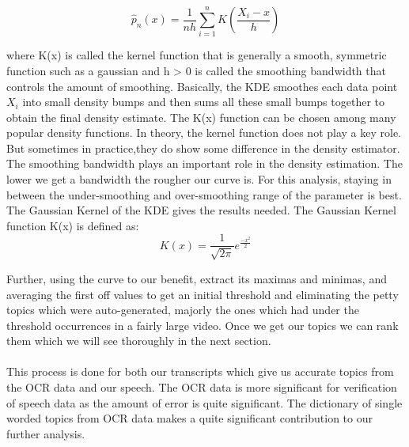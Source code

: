 \documentclass[conference]{IEEEtran}
\begin{document}
$$ \hat{p}_{n}(x) = \frac{1}{nh}\sum\limits_{i=1}^n K(\frac{X_{i}-x}{h})$$

\indent where K(x) is called the kernel function that is generally a smooth, symmetric function such as a gaussian and h > 0 is called the smoothing bandwidth that controls the amount of smoothing. Basically, the KDE smoothes each data point $X_{i}$ into small density bumps and then sums all these small bumps together to obtain the final density estimate. \cite{b6} The K(x) function can be chosen among many popular density functions. In theory, the kernel function does not play a key role. But sometimes in practice,they do show some difference in the density estimator. \cite{b6} The smoothing bandwidth plays an important role in the density estimation. The lower we get a bandwidth the rougher our curve is. For this analysis, staying in between the under-smoothing and over-smoothing range of the parameter is best.\\
\indent	The Gaussian Kernel of the KDE gives the results needed. The Gaussian Kernel function K(x) is defined as:
$$K(x) = \frac{1}{\sqrt{2\pi}}e^\frac{-x^2}{2}$$

\indent Further, using the curve to our benefit, extract its maximas and minimas, and averaging the first off values to get an initial threshold and eliminating the petty topics which were auto-generated, majorly the ones which had under the threshold occurrences in a fairly large video. Once we get our topics we can rank them which we will see thoroughly in the next section.\\
\\
This process is done for both our transcripts which give us accurate topics from the OCR data and our speech. The OCR data is more significant for verification of speech data as the amount of error is quite significant. The dictionary of single worded topics from OCR data makes a quite significant contribution to our further analysis.
\end{document}
